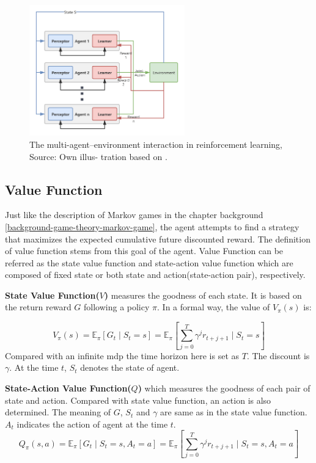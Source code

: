 \begin{figure}[htbp]
\centering
\includegraphics[width=0.6\textwidth]{./images/multi-agent-environment-interaction.png}
\caption{The multi-agent–environment interaction in reinforcement learning, Source: Own illus-
tration based on \parencite{en13010123}.}
\label{fig:multi-agent-environment-interaction}
\end{figure}

\subsection{Value Function} \label{background:value-function}
Just like the description of Markov games in the chapter background \ref{background-game-theory-markov-game}, the agent attempts to find a strategy that maximizes the expected cumulative future discounted reward. The definition of value function stems from this goal of the agent. Value Function can be referred as the state value function and state-action value function which are composed of fixed state or both state and action(state-action pair), respectively.

\textbf{State Value Function($V$)} measures the goodness of each state. It is based on the return reward $G$ following a policy $\pi$. In a formal way, the value of $V_\pi(s)$ is:

\begin{equation} 
V_{\pi}(s)=\mathbb{E}_{\pi}\left[G_{t} \mid S_{t}=s \right]=\mathbb{E}_{\pi}\left[\sum_{j=0}^{T} \gamma^{j} r_{t+j+1} \mid S_{t}=s\right]
\end{equation}
Compared with an infinite \gls{mdp} the time horizon here is set as $T$. The discount is $\gamma$. At the time $t$, $S_t$ denotes the state of agent.

\textbf{State-Action Value Function($Q$)} which measures the goodness of each pair of state and action. Compared with state value function, an action is also determined. The meaning of $G$, $S_t$ and $\gamma$ are same as in the state value function. $A_t$ indicates the action of agent at the time $t$.
\begin{equation}
Q_{\pi}(s, a)=\mathbb{E}_{\pi}\left[G_{t} \mid S_{t}=s, A_{t}=a\right]=\mathbb{E}_{\pi}\left[\sum_{j=0}^{T} \gamma^{j} r_{t+j+1} \mid S_{t}=s, A_{t}=a\right]
\end{equation}

